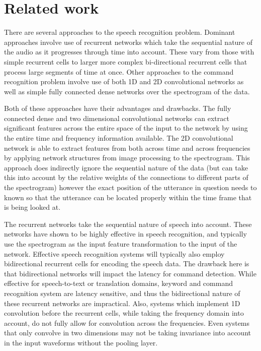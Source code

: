 \documentclass{article}
\begin{document}
\section{Related work}
There are several approaches to the speech recognition
problem. Dominant approaches involve use of recurrent networks which
take the sequential nature of the audio as it progresses through time
into account. These vary from those with simple recurrent cells to
larger more complex bi-directional recurrent cells that process large
segments of time at once\cite{amodei2016deep}. Other approaches to the
command recognition
problem involve use of both 1D and 2D convolutional
networks\cite{oxerin-baseline, arik2017convolutional} as well
as simple fully connected dense networks over the spectrogram of the
data.

Both of these approaches have their advantages and drawbacks. The
fully connected dense and two dimensional convolutional
networks can extract significant features across the entire space of
the input to the network by using the entire time and frequency
information available\cite{hinton2012deep}. The 2D convolutional
network is able to extract
features from both across time and across frequencies by applying
network structures from image processing to the
spectrogram\cite{sainath2015convolutional}. This
approach does indirectly ignore the sequential nature of the data (but
can take
this into account by the relative weights of the connections to
different parts of the spectrogram) however the exact position of the
utterance in question needs to known so that the utterance can be
located properly within the time frame that is being looked at.

The recurrent networks take the sequential nature of speech into
account. These networks have shown to be highly effective in speech
recognition, and typically use the spectrogram as the input feature
transformation to the input of the network. Effective speech
recognition systems will typically also employ bidirectional recurrent
cells for encoding the speech data\cite{zhang2017hello}. The drawback
here is that
bidirectional networks will impact the latency for command
detection. While effective for speech-to-text or translation domains,
keyword and command recognition system are latency sensitive, and thus
the bidirectional nature of these recurrent networks are
impractical. Also, systems which implement 1D convolution before the
recurrent cells, while taking the frequency domain into account, do
not fully allow for convolution across the frequencies. Even systems
that only convolve in two dimensions may not be taking invariance into
account in the input waveforms without the pooling layer.
\end{document}
